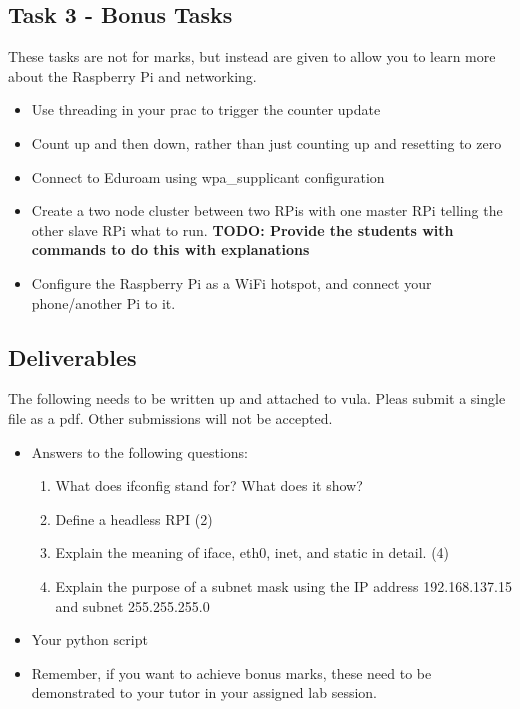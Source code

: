 \subsection{Task 3 - Bonus Tasks}
These tasks are not for marks, but instead are given to allow you to learn more about the Raspberry Pi and networking. 
\begin{itemize}
    \item Use threading in your prac to trigger the counter update
    \item Count up and then down, rather than just counting up and resetting to zero
    \item Connect to Eduroam using wpa\_supplicant configuration
    \item Create a two node cluster between two RPis with one master RPi telling the other slave RPi what to run. \textbf{TODO: Provide the students with commands to do this with explanations} 
    \item Configure the Raspberry Pi as a WiFi hotspot, and connect your phone/another Pi to it.
\end{itemize}

\subsection{Deliverables}
The following needs to be written up and attached to vula. Pleas submit a single file as a pdf. Other submissions will not be accepted.
\begin{itemize}
    \item Answers to the following questions:
        \begin{enumerate}
            \item What does ifconfig stand for? What does it show?
            \item Define a headless RPI (2)
            \item Explain the meaning of iface, eth0, inet, and static in detail. (4)
            \item Explain the purpose of a subnet mask using the IP address 192.168.137.15 and subnet 255.255.255.0
        \end{enumerate}
    \item Your python script
    \item Remember, if you want to achieve bonus marks, these need to be demonstrated to your tutor in your assigned lab session.
\end{itemize}

